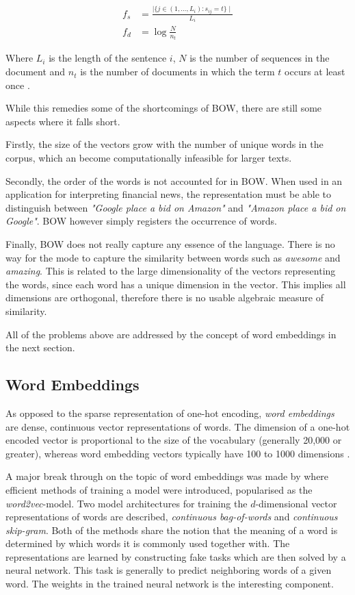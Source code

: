 \begin{align*}
    f_s &= \frac{\mid \{ j \in (1, \hdots , L_i) : s_{ij} = t  \} \mid}{L_i} \\
    f_d &= \log{\frac{N}{n_t}}
\end{align*}

Where $L_i$ is the length of the sentence $i$, $N$ is the number of sequences in the document and $n_t$ is the number of documents in which the term $t$ occurs at least once \citep{manning2008introduction}. 

While this remedies some of the shortcomings of BOW, there are still some aspects where it falls short. 

Firstly, the size of the vectors grow with the number of unique words in the corpus, which an become computationally infeasible for larger texts. 

Secondly, the order of the words is not accounted for in BOW. When used in an application for interpreting financial news, the representation must be able to distinguish between \textit{"Google place a bid on Amazon"} and \textit{"Amazon place a bid on Google"}. BOW however simply registers the occurrence of words. 

Finally, BOW does not really capture any essence of the language. There is no way for the mode to capture the similarity between words such as \textit{awesome} and \textit{amazing}. This is related to the large dimensionality of the vectors representing the words, since each word has a unique dimension in the vector. This implies all dimensions are orthogonal, therefore there is no usable algebraic measure of similarity. 


All of the problems above are addressed by the concept of word embeddings in the next section. 




\subsection{Word Embeddings}

As opposed to the sparse representation of one-hot encoding, \textit{word embeddings} are dense, continuous vector representations of words. The dimension of a one-hot encoded vector is proportional to the size of the vocabulary (generally 20,000 or greater), whereas word embedding vectors typically have 100 to 1000 dimensions \citet{chollet2017deep}.

A major break through on the topic of word embeddings was made by \citep{mikolov2013efficient} where efficient methods of training a model were introduced, popularised as the \textit{word2vec}-model. Two model architectures for training the $d$-dimensional vector representations of words are described, \textit{continuous bag-of-words} and \textit{continuous skip-gram}. Both of the methods share the  notion that the meaning of a word is determined by which words it is commonly used together with. The representations are learned by constructing fake tasks which are then solved by a neural network. This task is generally to predict neighboring words of a given word. The weights in the trained neural network is the interesting component.

